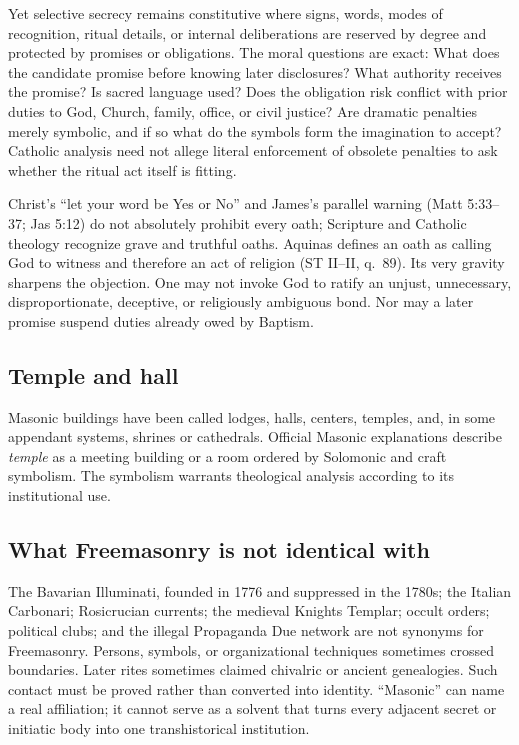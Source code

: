 Yet selective secrecy remains constitutive where signs, words, modes of recognition, ritual details, or internal deliberations are reserved by degree and protected by promises or obligations. The moral questions are exact: What does the candidate promise before knowing later disclosures? What authority receives the promise? Is sacred language used? Does the obligation risk conflict with prior duties to God, Church, family, office, or civil justice? Are dramatic penalties merely symbolic, and if so what do the symbols form the imagination to accept? Catholic analysis need not allege literal enforcement of obsolete penalties to ask whether the ritual act itself is fitting.

Christ's “let your word be Yes or No” and James's parallel warning (Matt 5:33--37; Jas 5:12) do not absolutely prohibit every oath; Scripture and Catholic theology recognize grave and truthful oaths. Aquinas defines an oath as calling God to witness and therefore an act of religion (ST II--II, q.~89). Its very gravity sharpens the objection. One may not invoke God to ratify an unjust, unnecessary, disproportionate, deceptive, or religiously ambiguous bond. Nor may a later promise suspend duties already owed by Baptism.

\subsection{Temple and hall}

Masonic buildings have been called lodges, halls, centers, temples, and, in some appendant systems, shrines or cathedrals. Official Masonic explanations describe \emph{temple} as a meeting building or a room ordered by Solomonic and craft symbolism. The symbolism warrants theological analysis according to its institutional use.

\subsection{What Freemasonry is not identical with}

The Bavarian Illuminati, founded in 1776 and suppressed in the 1780s; the Italian Carbonari; Rosicrucian currents; the medieval Knights Templar; occult orders; political clubs; and the illegal Propaganda Due network are not synonyms for Freemasonry. Persons, symbols, or organizational techniques sometimes crossed boundaries. Later rites sometimes claimed chivalric or ancient genealogies. Such contact must be proved rather than converted into identity. “Masonic” can name a real affiliation; it cannot serve as a solvent that turns every adjacent secret or initiatic body into one transhistorical institution.


